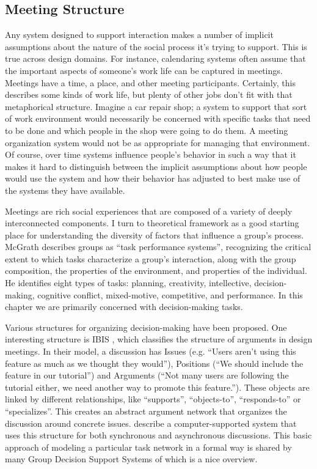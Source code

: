 \subsection{Meeting Structure}

Any system designed to support interaction makes a number of implicit assumptions about the nature of the social process it's trying to support. This is true across design domains. For instance, calendaring systems often assume that the important aspects of someone's work life can be captured in meetings. Meetings have a time, a place, and other meeting participants. Certainly, this describes some kinds of work life, but plenty of other jobs don't fit with that metaphorical structure. Imagine a car repair shop; a system to support that sort of work environment would necessarily be concerned with specific tasks that need to be done and which people in the shop were going to do them. A meeting organization system would not be as appropriate for managing that environment. Of course, over time systems influence people's behavior in such a way that it makes it hard to distinguish between the implicit assumptions about how people would use the system and how their behavior has adjusted to best make use of the systems they have available. 

Meetings are rich social experiences that are composed of a variety of deeply interconnected components. I turn to  theoretical framework as a good starting place for understanding the diversity of factors that influence a group's process. McGrath describes groups as ``task performance systems'', recognizing the critical extent to which tasks characterize a group's interaction, along with the group composition, the properties of the environment, and properties of the individual. He identifies eight types of tasks: planning, creativity, intellective, decision-making, cognitive conflict, mixed-motive, competitive, and performance. In this chapter we are primarily concerned with decision-making tasks.

Various structures for organizing decision-making have been proposed. One interesting structure is IBIS \citep{Kunz:1970wo}, which classifies the structure of arguments in design meetings. In their model, a discussion has Issues (e.g. ``Users aren't using this feature as much as we thought they would''), Positions (``We should include the feature in our tutorial'') and Arguments (``Not many users are following the tutorial either, we need another way to promote this feature.''). These objects are linked by different relationships, like ``supports'', ``objects-to'', ``responds-to'' or ``specializes''. This creates an abstract argument network that organizes the discussion around concrete issues. \citet{Conklin:1988fr} describe a computer-supported system that uses this structure for both synchronous and asynchronous discussions. This basic approach of modeling a particular task network in a formal way is shared by many Group Decision Support Systems of which \citet{nunamaker_electronic_1991} is a nice overview.

